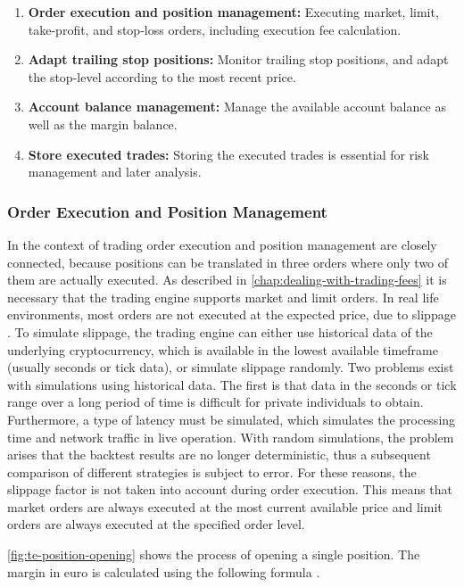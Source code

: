 \begin{enumerate}
    \item \textbf{Order execution and position management:} Executing market, limit, take-profit, and stop-loss orders, including execution fee calculation.
    \item \textbf{Adapt trailing stop positions:} Monitor trailing stop positions, and adapt the stop-level according to the most recent price.
    \item \textbf{Account balance management:} Manage the available account balance as well as the margin balance.
    \item \textbf{Store executed trades:} Storing the executed trades is essential for risk management and later analysis.
\end{enumerate}

\subsubsection{Order Execution and Position Management}

In the context of trading order execution and position management are closely connected, because positions can be translated in three orders where only two of them are actually executed.
As described in \autoref{chap:dealing-with-trading-fees} it is necessary that the trading engine supports market and limit orders.
In real life environments, most orders are not executed at the expected price, due to slippage \cite{ig-slippage}.
To simulate slippage, the trading engine can either use historical data of the underlying cryptocurrency, which is available in the lowest available timeframe (usually seconds or tick data), or simulate slippage randomly.
Two problems exist with simulations using historical data.
The first is that data in the seconds or tick range over a long period of time is difficult for private individuals to obtain.
Furthermore, a type of latency must be simulated, which simulates the processing time and network traffic in live operation.
With random simulations, the problem arises that the backtest results are no longer deterministic, thus a subsequent comparison of different strategies is subject to error.
For these reasons, the slippage factor is not taken into account during order execution.
This means that market orders are always executed at the most current available price and limit orders are always executed at the specified order level.


\autoref{fig:te-position-opening} shows the process of opening a single position.
The margin in euro is calculated using the following formula \cite{margin-calculation}.


